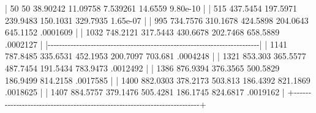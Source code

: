 \documentclass[
  12pt,
  letterpaper,
  DIV=11,
  numbers=noendperiod,
  onepage,
  openany]{scrreprt}
\newenvironment{Shaded}{\begin{snugshade}}{\end{snugshade}}
\newcommand{\DecValTok}[1]{\textcolor[rgb]{0.86,0.86,0.80}{#1}}
\newcommand{\ErrorTok}[1]{\textcolor[rgb]{0.76,0.75,0.62}{#1}}
\newcommand{\FloatTok}[1]{\textcolor[rgb]{0.75,0.75,0.82}{#1}}
\newcommand{\NormalTok}[1]{\textcolor[rgb]{0.80,0.80,0.80}{#1}}
\newcommand{\SpecialCharTok}[1]{\textcolor[rgb]{0.86,0.64,0.64}{#1}}
\begin{document}
\begin{Shaded}
\begin{Highlighting}[]
  \ErrorTok{|}    \DecValTok{50}         \DecValTok{50}   \FloatTok{38.90242}   \FloatTok{11.09758}    \FloatTok{7.539261}    \FloatTok{14.6559}   \FloatTok{9.80e{-}10} \SpecialCharTok{|}
  \ErrorTok{|}   \DecValTok{515}   \FloatTok{437.5454}   \FloatTok{197.5971}   \FloatTok{239.9483}    \FloatTok{150.1031}   \FloatTok{329.7935}   \FloatTok{1.65e{-}07} \SpecialCharTok{|}  
  \ErrorTok{|}   \DecValTok{995}   \FloatTok{734.7576}   \FloatTok{310.1678}   \FloatTok{424.5898}    \FloatTok{204.0643}   \FloatTok{645.1152}\NormalTok{   .}\DecValTok{0001609} \SpecialCharTok{|}
  \ErrorTok{|}  \DecValTok{1032}   \FloatTok{748.2121}   \FloatTok{317.5443}   \FloatTok{430.6678}    \FloatTok{202.7468}   \FloatTok{658.5889}\NormalTok{   .}\DecValTok{0002127} \SpecialCharTok{|}
  \ErrorTok{|}\SpecialCharTok{{-}{-}{-}{-}{-}{-}{-}{-}{-}{-}{-}{-}{-}{-}{-}{-}{-}{-}{-}{-}{-}{-}{-}{-}{-}{-}{-}{-}{-}{-}{-}{-}{-}{-}{-}{-}{-}{-}{-}{-}{-}{-}{-}{-}{-}{-}{-}{-}{-}{-}{-}{-}{-}{-}{-}{-}{-}{-}{-}{-}{-}{-}{-}{-}{-}{-}{-}{-}{-}{-}{-}{-}{-}{-}}\ErrorTok{|}
  \ErrorTok{|}  \DecValTok{1141}   \FloatTok{787.8485}   \FloatTok{335.6531}   \FloatTok{452.1953}    \FloatTok{200.7097}    \FloatTok{703.681}\NormalTok{   .}\DecValTok{0004248} \SpecialCharTok{|}
  \ErrorTok{|}  \DecValTok{1321}    \FloatTok{853.303}   \FloatTok{365.5577}   \FloatTok{487.7454}    \FloatTok{191.5434}   \FloatTok{783.9473}\NormalTok{   .}\DecValTok{0012492} \SpecialCharTok{|}
  \ErrorTok{|}  \DecValTok{1386}   \FloatTok{876.9394}   \FloatTok{376.3565}   \FloatTok{500.5829}    \FloatTok{186.9499}   \FloatTok{814.2158}\NormalTok{   .}\DecValTok{0017585} \SpecialCharTok{|}
  \ErrorTok{|}  \DecValTok{1400}   \FloatTok{882.0303}   \FloatTok{378.2173}    \FloatTok{503.813}    \FloatTok{186.4392}   \FloatTok{821.1869}\NormalTok{   .}\DecValTok{0018625} \SpecialCharTok{|}
  \ErrorTok{|}  \DecValTok{1407}   \FloatTok{884.5757}   \FloatTok{379.1476}   \FloatTok{505.4281}    \FloatTok{186.1745}   \FloatTok{824.6817}\NormalTok{   .}\DecValTok{0019162} \SpecialCharTok{|}
  \SpecialCharTok{+{-}{-}{-}{-}{-}{-}{-}{-}{-}{-}{-}{-}{-}{-}{-}{-}{-}{-}{-}{-}{-}{-}{-}{-}{-}{-}{-}{-}{-}{-}{-}{-}{-}{-}{-}{-}{-}{-}{-}{-}{-}{-}{-}{-}{-}{-}{-}{-}{-}{-}{-}{-}{-}{-}{-}{-}{-}{-}{-}{-}{-}{-}{-}{-}{-}{-}{-}{-}{-}{-}{-}{-}{-}{-}+}
\end{Highlighting}
\end{Shaded}
\end{document}
